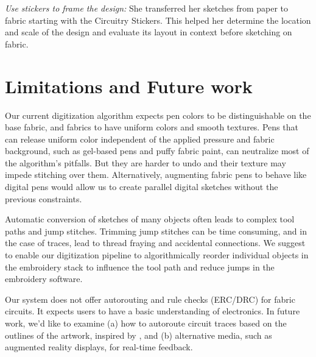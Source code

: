 \documentclass[header.tex]{subfiles}
\begin{document}
\textit{Use stickers to frame the design:} She transferred her sketches from paper to fabric starting with the Circuitry Stickers. This helped her determine the location and scale of the design and evaluate its layout in context before sketching on fabric. 


\section{Limitations and Future work}
Our current digitization algorithm expects pen colors to be distinguishable on the base fabric, and fabrics to have uniform colors and smooth textures. Pens that can release uniform color independent of the applied pressure and fabric background, such as gel-based pens and puffy fabric paint, can neutralize most of the algorithm's pitfalls. But they are harder to undo and their texture may impede stitching over them. Alternatively, augmenting fabric pens to behave like digital pens would allow us to create parallel digital sketches without the previous constraints.





Automatic conversion of sketches of many objects often leads to complex tool paths and jump stitches. Trimming jump stitches can be time consuming, and in the case of traces, lead to thread fraying and accidental connections.  We suggest to enable our digitization pipeline to algorithmically reorder individual objects in the embroidery stack to influence the tool path and reduce jumps in the embroidery software.





Our system does not offer autorouting and rule checks (ERC/DRC) for fabric circuits. It expects users to have a basic understanding of electronics.  %
In future work, we'd like to examine (a) how to autoroute circuit traces based on the outlines of the artwork, inspired by \cite{savage2014series}, and (b) alternative media, such as augmented reality displays, for real-time feedback.
\end{document}
